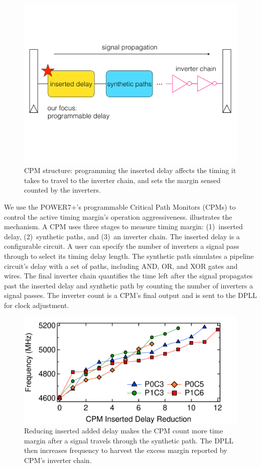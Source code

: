\begin{figure}[t]
  \centering
  \includegraphics[trim=0 210 0 190,clip,width=0.8\linewidth]{graphs/process//cpm-struct.pdf}
  \caption{CPM structure: programming the inserted delay affects the timing it takes to travel to the inverter chain, and sets the margin sensed counted by the inverters.~\cite{drake2007distributed, drake2013single}
  \label{fig:cpm-struct}
  }
\end{figure}

We use the POWER7+'s programmable Critical Path Monitors (CPMs) to control the active timing margin's operation aggressiveness.  illustrates the mechanism. A CPM uses three stages to measure timing margin: (1)~inserted delay, (2)~synthetic paths, and (3)~an inverter chain. The inserted delay is a configurable circuit. A user can specify the number of inverters a signal pass through to select its timing delay length. The synthetic path simulates a pipeline circuit's delay with a set of paths, including AND, OR, and XOR gates and wires. The final inverter chain quantifies the time left after the signal propagates past the inserted delay and synthetic path by counting the number of inverters a signal passes. The inverter count is a CPM's final output and is sent to the DPLL for clock adjustment.

\begin{figure}[t]
    \centering
    \includegraphics[trim=0 0 0 0,clip,width=.8\linewidth]{graphs/process//delay-freq.pdf}    
    \caption{Reducing inserted added delay makes the CPM count more time margin after a signal travels through the synthetic path. The DPLL then increases frequency to harvest the excess margin reported by CPM's inverter chain.}
    \label{fig:delay-freq}
\end{figure}

